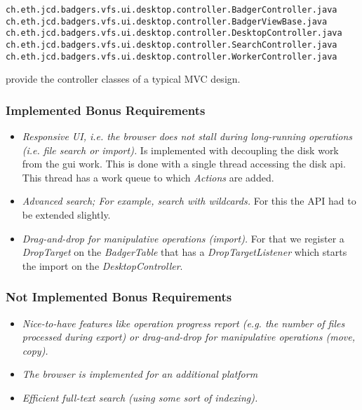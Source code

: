 \begin{verbatim}
ch.eth.jcd.badgers.vfs.ui.desktop.controller.BadgerController.java
ch.eth.jcd.badgers.vfs.ui.desktop.controller.BadgerViewBase.java
ch.eth.jcd.badgers.vfs.ui.desktop.controller.DesktopController.java
ch.eth.jcd.badgers.vfs.ui.desktop.controller.SearchController.java
ch.eth.jcd.badgers.vfs.ui.desktop.controller.WorkerController.java
\end{verbatim} provide the controller classes of a typical MVC design. 


\subsubsection {Implemented Bonus Requirements}
\begin{itemize}
  \item \emph{Responsive UI, i.e. the browser does not stall during long-running
  operations (i.e. file search or import).} Is implemented with decoupling the
  disk work from the gui work. This is done with a single thread accessing the
  disk api. This thread has a work queue to which \textit{Actions} are added.
  \item \emph{Advanced search; For example, search with wildcards.} For this the
  API had to be extended slightly.
  \item \emph{Drag-and-drop for manipulative operations (import).} For that we
  register a \textit{DropTarget} on the \textit{BadgerTable} that has a
  \textit{DropTargetListener} which starts the import on the
  \textit{DesktopController}.
\end{itemize}

\subsubsection {Not Implemented Bonus Requirements}
\begin{itemize}
  \item \emph{Nice-to-have features like operation progress report (e.g. the
  number of files processed during export) or drag-and-drop for manipulative
  operations (move, copy).}
  \item \emph{The browser is implemented for an additional platform}
  \item \emph{Efficient full-text search (using some sort of indexing).}
\end{itemize}
